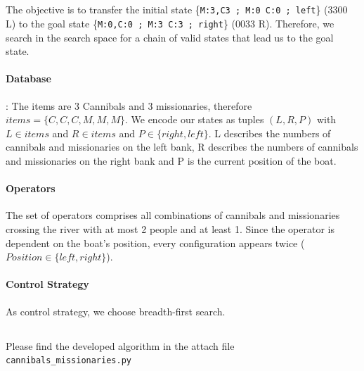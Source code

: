 \documentclass[11pt]{article}
\begin{document}
\subsection{}
The objective is to transfer the initial state \{\texttt{M:3,C3 ; M:0 C:0 ; left}\} (3300 L) to the goal state \{\texttt{M:0,C:0 ; M:3 C:3 ; right}\} (0033 R). Therefore, we search in the search space for a chain of valid states that lead us to the goal state.
\paragraph{Database}: The items are 3 Cannibals and 3 missionaries, therefore $items = \{C,C,C,M,M,M\}$. We encode our states as tuples $(L,R,P)$ with $L \in items$ and $R \in items$ and $P \in \{right,left\}$. L describes the numbers of cannibals and missionaries on the left bank, R describes the numbers of cannibals and missionaries on the right bank and P is the current position of the boat.

\paragraph{Operators} The set of operators comprises all combinations of cannibals and missionaries crossing the river with at most 2 people and at least 1. Since the operator is dependent on the boat's position, every configuration appears twice ($Position \in \{left,right\}$). 

\paragraph{Control Strategy}
As control strategy, we choose breadth-first search.

\subsection{}
Please find the developed algorithm in the attach file \texttt{cannibals\_missionaries.py}
\end{document}
